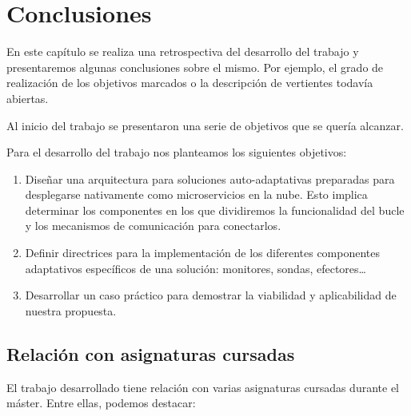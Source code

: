 \chapter{Conclusiones}
\label{chap:conclusiones}

En este capítulo se realiza una retrospectiva del desarrollo del trabajo y presentaremos algunas conclusiones sobre el mismo. Por ejemplo, el grado de realización de los objetivos marcados o la descripción de vertientes todavía abiertas.

Al inicio del trabajo se presentaron una serie de objetivos que se quería alcanzar.


Para el desarrollo del trabajo nos planteamos los siguientes objetivos:

\begin{enumerate}
  \item Diseñar una arquitectura para soluciones auto-adaptativas preparadas para desplegarse nativamente como microservicios en la nube. Esto implica determinar los componentes en los que dividiremos la funcionalidad del bucle y los mecanismos de comunicación para conectarlos.

  \item Definir directrices para la implementación de los diferentes componentes adaptativos específicos de una solución: monitores, sondas, efectores\dots

  \item Desarrollar un caso práctico para demostrar la viabilidad y aplicabilidad de nuestra propuesta.
\end{enumerate}

\section{Relación con asignaturas cursadas}

El trabajo desarrollado tiene relación con varias asignaturas cursadas durante el máster. Entre ellas, podemos destacar:

